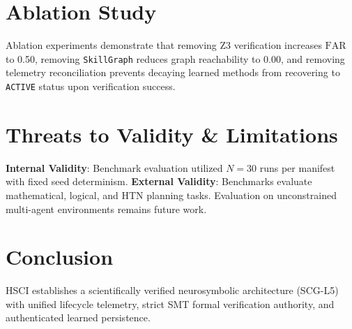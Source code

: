 \documentclass[letterpaper]{article}
\begin{document}
\section{Ablation Study}
Ablation experiments demonstrate that removing Z3 verification increases $\text{FAR}$ to 0.50, removing \texttt{SkillGraph} reduces graph reachability to 0.00, and removing telemetry reconciliation prevents decaying learned methods from recovering to \texttt{ACTIVE} status upon verification success.

\section{Threats to Validity \& Limitations}
\textbf{Internal Validity}: Benchmark evaluation utilized $N=30$ runs per manifest with fixed seed determinism.
\textbf{External Validity}: Benchmarks evaluate mathematical, logical, and HTN planning tasks. Evaluation on unconstrained multi-agent environments remains future work.

\section{Conclusion}
HSCI establishes a scientifically verified neurosymbolic architecture (SCG-L5) with unified lifecycle telemetry, strict SMT formal verification authority, and authenticated learned persistence.



\end{document}
